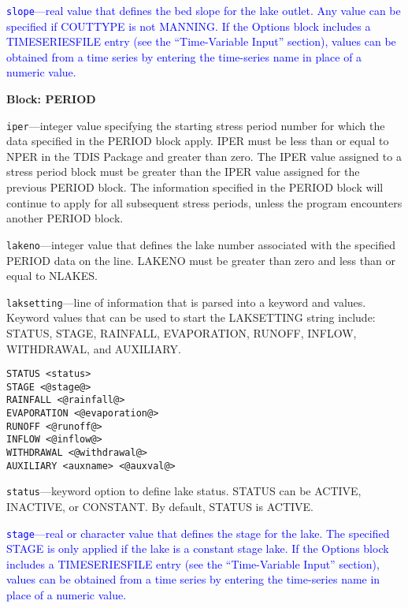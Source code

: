\begin{description}
\item \textcolor{blue}{\texttt{slope}---real value that defines the bed slope for the lake outlet. Any value can be specified if COUTTYPE is not MANNING. If the Options block includes a TIMESERIESFILE entry (see the ``Time-Variable Input'' section), values can be obtained from a time series by entering the time-series name in place of a numeric value.}

\end{description}
\item \textbf{Block: PERIOD}

\begin{description}
\item \texttt{iper}---integer value specifying the starting stress period number for which the data specified in the PERIOD block apply.  IPER must be less than or equal to NPER in the TDIS Package and greater than zero.  The IPER value assigned to a stress period block must be greater than the IPER value assigned for the previous PERIOD block.  The information specified in the PERIOD block will continue to apply for all subsequent stress periods, unless the program encounters another PERIOD block.

\item \texttt{lakeno}---integer value that defines the lake number associated with the specified PERIOD data on the line. LAKENO must be greater than zero and less than or equal to NLAKES.

\item \texttt{laksetting}---line of information that is parsed into a keyword and values.  Keyword values that can be used to start the LAKSETTING string include: STATUS, STAGE, RAINFALL, EVAPORATION, RUNOFF, INFLOW, WITHDRAWAL, and AUXILIARY.

\begin{lstlisting}[style=blockdefinition]
STATUS <status>
STAGE <@stage@>
RAINFALL <@rainfall@>
EVAPORATION <@evaporation@>
RUNOFF <@runoff@>
INFLOW <@inflow@>
WITHDRAWAL <@withdrawal@>
AUXILIARY <auxname> <@auxval@> 
\end{lstlisting}

\item \texttt{status}---keyword option to define lake status.  STATUS can be ACTIVE, INACTIVE, or CONSTANT. By default, STATUS is ACTIVE.

\item \textcolor{blue}{\texttt{stage}---real or character value that defines the stage for the lake. The specified STAGE is only applied if the lake is a constant stage lake. If the Options block includes a TIMESERIESFILE entry (see the ``Time-Variable Input'' section), values can be obtained from a time series by entering the time-series name in place of a numeric value.}


\end{description}
